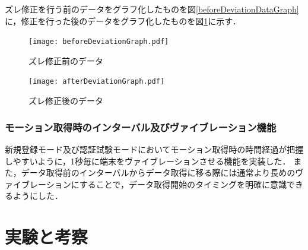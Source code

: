 \documentclass[11pt]{jreport}
\begin{document}
        ズレ修正を行う前のデータをグラフ化したものを図\ref{beforeDeviationDataGraph}に，修正を行った後のデータをグラフ化したものを図\ref{afterDeviationDataGraph}に示す．

        \begin{figure}[btp]
            \begin{minipage}{0.5\hsize}
                \begin{center}
                    \texttt{[image: beforeDeviationGraph.pdf]}
                \end{center}
                \caption{ズレ修正前のデータ}
                \label{beforeDeviationDataGraph}
            \end{minipage}
            \begin{minipage}{0.5\hsize}
                \begin{center}
                    \texttt{[image: afterDeviationGraph.pdf]}
                \end{center}
                \caption{ズレ修正後のデータ}
                \label{afterDeviationDataGraph}
            \end{minipage}
        \end{figure}

        \subsection{モーション取得時のインターバル及びヴァイブレーション機能}
        新規登録モード及び認証試験モードにおいてモーション取得時の時間経過が把握しやすいように，1秒毎に端末をヴァイブレーションさせる機能を実装した．
        また，データ取得前のインターバルからデータ取得に移る際には通常より長めのヴァイブレーションにすることで，データ取得開始のタイミングを明確に意識できるようにした．

\chapter{実験と考察}
\end{document}
